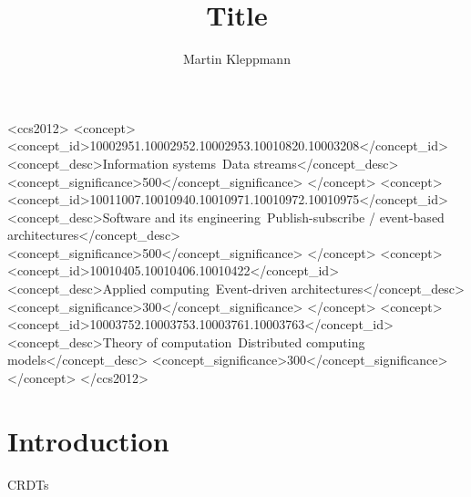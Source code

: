 \documentclass[sigconf,nonacm]{acmart}
\begin{document}
\title{Title}

\author{Martin Kleppmann}

\begin{abstract}
\end{abstract}

\begin{CCSXML}
<ccs2012>
  <concept>
    <concept_id>10002951.10002952.10002953.10010820.10003208</concept_id>
    <concept_desc>Information systems~Data streams</concept_desc>
    <concept_significance>500</concept_significance>
  </concept>
  <concept>
    <concept_id>10011007.10010940.10010971.10010972.10010975</concept_id>
    <concept_desc>Software and its engineering~Publish-subscribe / event-based architectures</concept_desc>
    <concept_significance>500</concept_significance>
  </concept>
  <concept>
    <concept_id>10010405.10010406.10010422</concept_id>
    <concept_desc>Applied computing~Event-driven architectures</concept_desc>
    <concept_significance>300</concept_significance>
  </concept>
  <concept>
    <concept_id>10003752.10003753.10003761.10003763</concept_id>
    <concept_desc>Theory of computation~Distributed computing models</concept_desc>
    <concept_significance>300</concept_significance>
  </concept>
</ccs2012>
\end{CCSXML}


\maketitle

\section{Introduction}

CRDTs~\cite{Shapiro:2011un}


{}
\end{document}
